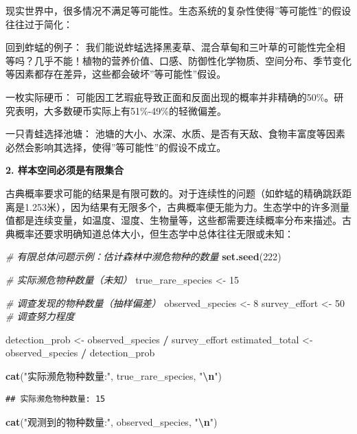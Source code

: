 \documentclass[
  twoside]{book}
\newenvironment{Shaded}{\begin{snugshade}}{\end{snugshade}}
\newcommand{\CommentTok}[1]{\textcolor[rgb]{0.56,0.35,0.01}{\textit{#1}}}
\newcommand{\DecValTok}[1]{\textcolor[rgb]{0.00,0.00,0.81}{#1}}
\newcommand{\FunctionTok}[1]{\textcolor[rgb]{0.13,0.29,0.53}{\textbf{#1}}}
\newcommand{\NormalTok}[1]{#1}
\newcommand{\OtherTok}[1]{\textcolor[rgb]{0.56,0.35,0.01}{#1}}
\newcommand{\SpecialCharTok}[1]{\textcolor[rgb]{0.81,0.36,0.00}{\textbf{#1}}}
\newcommand{\StringTok}[1]{\textcolor[rgb]{0.31,0.60,0.02}{#1}}
\begin{document}
现实世界中，很多情况不满足等可能性。生态系统的复杂性使得''等可能性''的假设往往过于简化：

回到蚱蜢的例子： 我们能说蚱蜢选择黑麦草、混合草甸和三叶草的可能性完全相等吗？几乎不能！植物的营养价值、口感、防御性化学物质、空间分布、季节变化等因素都存在差异，这些都会破坏''等可能性''假设。

一枚实际硬币： 可能因工艺瑕疵导致正面和反面出现的概率并非精确的50\%。研究表明，大多数硬币实际上有51\%-49\%的轻微偏差。

一只青蛙选择池塘： 池塘的大小、水深、水质、是否有天敌、食物丰富度等因素必然会影响其选择，使得''等可能性''的假设不成立。

\textbf{2. 样本空间必须是有限集合}

古典概率要求可能的结果是有限可数的。对于连续性的问题（如蚱蜢的精确跳跃距离是1.253米），因为结果有无限多个，古典概率便无能为力。生态学中的许多测量值都是连续变量，如温度、湿度、生物量等，这些都需要连续概率分布来描述。古典概率还要求明确知道总体大小，但生态学中总体往往无限或未知：

\begin{Shaded}
\begin{Highlighting}[]
\CommentTok{\# 有限总体问题示例：估计森林中濒危物种的数量}
\FunctionTok{set.seed}\NormalTok{(}\DecValTok{222}\NormalTok{)}

\CommentTok{\# 实际濒危物种数量（未知）}
\NormalTok{true\_rare\_species }\OtherTok{\textless{}{-}} \DecValTok{15}

\CommentTok{\# 调查发现的物种数量（抽样偏差）}
\NormalTok{observed\_species }\OtherTok{\textless{}{-}} \DecValTok{8}
\NormalTok{survey\_effort }\OtherTok{\textless{}{-}} \DecValTok{50}  \CommentTok{\# 调查努力程度}

\NormalTok{detection\_prob }\OtherTok{\textless{}{-}}\NormalTok{ observed\_species }\SpecialCharTok{/}\NormalTok{ survey\_effort}
\NormalTok{estimated\_total }\OtherTok{\textless{}{-}}\NormalTok{ observed\_species }\SpecialCharTok{/}\NormalTok{ detection\_prob}

\FunctionTok{cat}\NormalTok{(}\StringTok{"实际濒危物种数量:"}\NormalTok{, true\_rare\_species, }\StringTok{"}\SpecialCharTok{\textbackslash{}n}\StringTok{"}\NormalTok{)}
\end{Highlighting}
\end{Shaded}

\begin{verbatim}
## 实际濒危物种数量: 15
\end{verbatim}

\begin{Shaded}
\begin{Highlighting}[]
\FunctionTok{cat}\NormalTok{(}\StringTok{"观测到的物种数量:"}\NormalTok{, observed\_species, }\StringTok{"}\SpecialCharTok{\textbackslash{}n}\StringTok{"}\NormalTok{)}
\end{Highlighting}
\end{Shaded}
\end{document}
